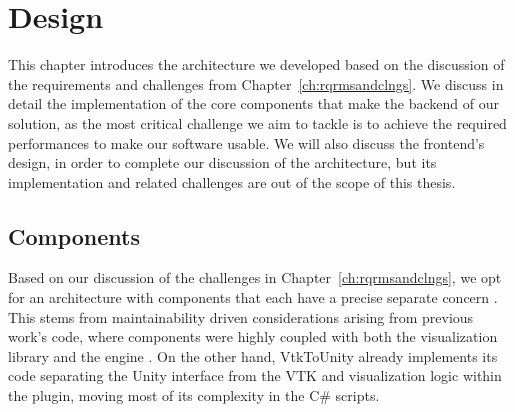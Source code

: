 \chapter{Design}
\label{ch:design}

This chapter introduces the architecture we developed based on the discussion of the requirements and challenges from Chapter~\ref{ch:rqrmsandclngs}. We discuss in detail the implementation of the core components that make the backend of our solution, as the most critical challenge we aim to tackle is to achieve the required performances to make our software usable. We will also discuss the frontend's design, in order to complete our discussion of the architecture, but its implementation and related challenges are out of the scope of this thesis.



\section{Components}
\label{sec:components}

Based on our discussion of the challenges in Chapter~\ref{ch:rqrmsandclngs}, we opt for an architecture with components that each have a precise separate concern \cite{Hursch95separationof}. This stems from maintainability driven considerations arising from previous work's code, where components were highly coupled with both the visualization library and the engine \cite{dreuning_visual_2016, duking_potential_2018, kruis_creating_2017}. On the other hand, VtkToUnity already implements its code separating the Unity interface from the VTK and visualization logic within the plugin, moving most of its complexity in the C\# scripts.


